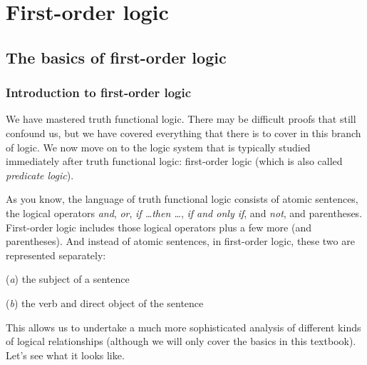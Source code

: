 \graphicspath{{figures--proofs/}}
\part{First-order logic}
\label{ch.FOL}

\chapter{The basics of first-order logic}\label{FOL-basics}

\section{Introduction to first-order logic}

We have mastered truth functional logic. There may be difficult proofs that still confound us, but we have covered everything that there is to cover in this branch of logic. We now move on to the logic system that is typically studied immediately after truth functional logic: first-order logic (which is also called \textit{predicate logic}). 

As you know, the language of truth functional logic consists of atomic sentences, the logical operators \textit{and}, \textit{or}, \textit{if \ldots then \ldots}, \textit{if and only if}, and \textit{not}, and parentheses. First-order logic includes those logical operators plus a few more (and parentheses). And instead of atomic sentences, in first-order logic, these two are represented separately: 
\begin{ebullet}
\item[(\textit{a})] the subject of a sentence
\item[(\textit{b})] the verb and direct object of the sentence
\end{ebullet}
This allows us to undertake a much more sophisticated analysis of different kinds of logical relationships (although we will only cover the basics in this textbook). Let's see what it looks like.


